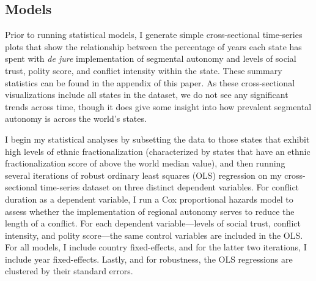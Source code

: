 \documentclass[12pt]{article}
\begin{document}
\subsection{Models}
Prior to running statistical models, I generate simple cross-sectional time-series plots that show the relationship between the percentage of years each state has spent with \textit{de jure} implementation of segmental autonomy and levels of social trust, polity score, and conflict intensity within the state. These summary statistics can be found in the appendix of this paper. As these cross-sectional visualizations include all states in the dataset, we do not see any significant trends across time, though it does give some insight into how prevalent segmental autonomy is across the world's states. 

I begin my statistical analyses by subsetting the data to those states that exhibit high levels of ethnic fractionalization (characterized by states that have an ethnic fractionalization score of above the world median value), and then running several iterations of robust ordinary least squares (OLS) regression on my cross-sectional time-series dataset on three distinct dependent variables. For conflict duration as a dependent variable, I run a Cox proportional hazards model to assess whether the implementation of regional autonomy serves to reduce the length of a conflict. For each dependent variable---levels of social trust, conflict intensity, and polity score---the same control variables are included in the OLS. For all models, I include country fixed-effects, and for the latter two iterations, I include year fixed-effects. Lastly, and for robustness, the OLS regressions are clustered by their standard errors.  
\end{document}
